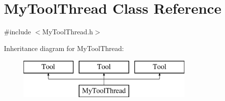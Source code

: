 \hypertarget{classMyToolThread}{\section{My\-Tool\-Thread Class Reference}
\label{classMyToolThread}
}


{\ttfamily \#include $<$My\-Tool\-Thread.\-h$>$}

Inheritance diagram for My\-Tool\-Thread\-:\begin{figure}[H]
\begin{center}
\leavevmode
\includegraphics[height=2.000000cm]{classMyToolThread}
\end{center}
\end{figure}
